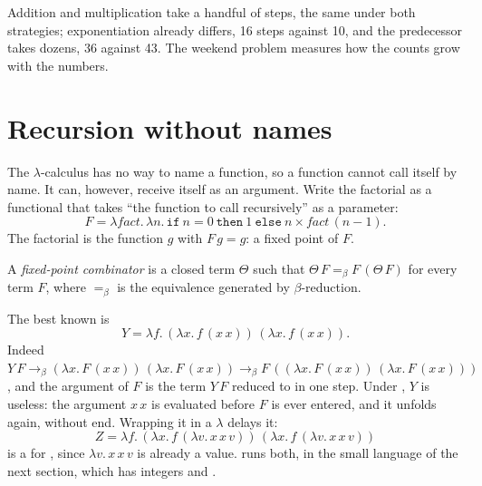 Addition and multiplication take a handful of steps, the same under both strategies; exponentiation already differs, 16 steps against 10, and the predecessor takes dozens, 36 against 43. The weekend problem measures how the counts grow with the numbers.

\section{Recursion without names}\label{sec:b3:lambda-calculus:fixpoint}

The $\lambda$-calculus has no way to name a function, so a function cannot call itself by name. It can, however, receive itself as an argument. Write the factorial as a functional that takes ``the function to call recursively'' as a parameter:
\[ F = \lambda \mathit{fact}.\,\lambda n.\,\mathtt{if}\ n = 0\ \mathtt{then}\ 1\ \mathtt{else}\ n \times \mathit{fact}\,(n - 1). \]
The factorial is the function $g$ with $F\,g = g$: a fixed point of $F$.

\begin{definition}\label{def:b3:lambda-calculus:fixpoint}
A \emph{fixed-point combinator} is a closed term $\Theta$ such that $\Theta\,F =_\beta F\,(\Theta\,F)$ for every term $F$, where $=_\beta$ is the equivalence generated by $\beta$-reduction.
\end{definition}

The best known is \[ Y = \lambda f.\,(\lambda x.\,f\,(x\,x))\,(\lambda x.\,f\,(x\,x)). \] Indeed $Y\,F \to_\beta (\lambda x.\,F\,(x\,x))\,(\lambda x.\,F\,(x\,x)) \to_\beta F\,((\lambda x.\,F\,(x\,x))\,(\lambda x.\,F\,(x\,x)))$, and the argument of $F$ is the term $Y\,F$ reduced to in one step. Under , $Y$ is useless: the argument $x\,x$ is evaluated before $F$ is ever entered, and it unfolds again, without end. Wrapping it in a $\lambda$ delays it: \[ Z = \lambda f.\,(\lambda x.\,f\,(\lambda v.\,x\,x\,v))\,(\lambda x.\,f\,(\lambda v.\,x\,x\,v)) \] is a  for , since $\lambda v.\,x\,x\,v$ is already a value.  runs both, in the small language of the next section, which has integers and .

\label{lst:b3:lambda-calculus:ycomb}

